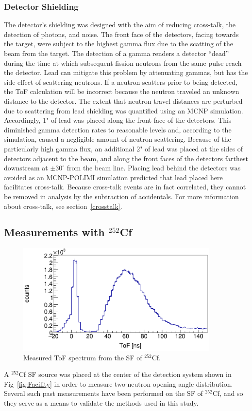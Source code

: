 \subsubsection{Detector Shielding}
The detector's shielding was designed with the aim of reducing cross-talk, the detection of photons, and noise.
The front face of the detectors, facing towards the target, were subject to the highest gamma flux due to the scatting of the beam from the target.
The detection of a gamma renders a detector ``dead'' during the time at which subsequent fission neutrons from the same pulse reach the detector.
Lead can mitigate this problem by attenuating gammas, but has the side effect of scattering neutrons.
If a neutron scatters prior to being detected, the ToF calculation will be incorrect because the neutron traveled an unknown distance to the detector.
The extent that neutron travel distances are perturbed due to scattering from lead shielding was quantified using an MCNP simulation.
Accordingly, 1" of lead was placed along the front face of the detectors.
This diminished gamma detection rates to reasonable levels and, according to the simulation, caused a negligible amount of neutron scattering.
Because of the particularly high gamma flux, an additional 2" of lead was placed at the sides of detectors adjacent to the beam, and along the front faces of the detectors farthest downstream at $\pm30^{\circ}$ from the beam line.
Placing lead behind the detectors was avoided as an MCNP-POLIMI simulation predicted that lead placed here facilitates cross-talk.
Because cross-talk events are in fact correlated, they cannot be removed in analysis by the subtraction of accidentals.
For more information about cross-talk, see section~\ref{crosstalk}.

\subsection{Measurements with $^{252}$Cf}
\begin{figure}[h]
\includegraphics[width=0.9\textwidth]{Content/Methods/Cf252ToF.png}
\caption{Measured ToF spectrum from the SF of $^{252}$Cf.}
\label{fig:Cf252ToF}
\end{figure}
A $^{252}$Cf SF source was placed at the center of the detection system shown in Fig~\ref{fig:Facility} in order to measure two-neutron opening angle distribution.
Several such past measurements have been performed on the SF of $^{252}$Cf, and so they serve as a means to validate the methods used in this study.

